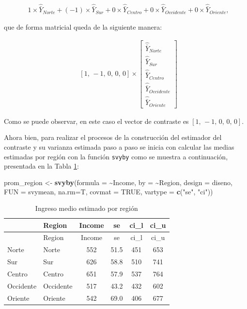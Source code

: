 \documentclass[
  spanish,
  12pt,
]{book}
\newenvironment{Shaded}{\begin{snugshade}}{\end{snugshade}}
\newcommand{\AttributeTok}[1]{\textcolor[rgb]{0.13,0.29,0.53}{#1}}
\newcommand{\ConstantTok}[1]{\textcolor[rgb]{0.56,0.35,0.01}{#1}}
\newcommand{\FunctionTok}[1]{\textcolor[rgb]{0.13,0.29,0.53}{\textbf{#1}}}
\newcommand{\NormalTok}[1]{#1}
\newcommand{\OtherTok}[1]{\textcolor[rgb]{0.56,0.35,0.01}{#1}}
\newcommand{\SpecialCharTok}[1]{\textcolor[rgb]{0.81,0.36,0.00}{\textbf{#1}}}
\newcommand{\StringTok}[1]{\textcolor[rgb]{0.31,0.60,0.02}{#1}}
\begin{document}
\begin{eqnarray*}
 & 1\times\hat{\bar{Y}}_{Norte}+\left(-1\right)\times\hat{\bar{Y}}_{Sur}+0\times\hat{\bar{Y}}_{Centro}+0\times\hat{\bar{Y}}_{Occidente}+0\times\hat{\bar{Y}}_{Oriente},
\end{eqnarray*}

que de forma matricial queda de la siguiente manera:

\begin{eqnarray*}
 & \left[1,\,-1,\,0,\,0,\,0\right]\times\left[\begin{array}{c}
\hat{\bar{Y}}_{Norte}\\
\hat{\bar{Y}}_{Sur}\\
\hat{\bar{Y}}_{Centro}\\
\hat{\bar{Y}}_{Occidente}\\
\hat{\bar{Y}}_{Oriente}
\end{array}\right]
\end{eqnarray*}

Como se puede observar, en este caso el vector de contraste es \(\left[1,\,-1,\,0,\,0,\,0\right]\).

Ahora bien, para realizar el procesos de la construcción del estimador del contraste y su varianza estimada paso a paso se inicia con calcular las medias estimadas por región con la función \texttt{svyby} como se muestra a continuación, presentada en la Tabla \ref{tab:tab-prom-region}:

\begin{Shaded}
\begin{Highlighting}[]
\NormalTok{prom\_region }\OtherTok{\textless{}{-}} \FunctionTok{svyby}\NormalTok{(}\AttributeTok{formula =} \SpecialCharTok{\textasciitilde{}}\NormalTok{Income,}
                     \AttributeTok{by =} \SpecialCharTok{\textasciitilde{}}\NormalTok{Region,}
                     \AttributeTok{design =}\NormalTok{ diseno,}
                     \AttributeTok{FUN =}\NormalTok{ svymean,}
                     \AttributeTok{na.rm=}\NormalTok{T,}
                     \AttributeTok{covmat =} \ConstantTok{TRUE}\NormalTok{,}
                     \AttributeTok{vartype =} \FunctionTok{c}\NormalTok{(}\StringTok{"se"}\NormalTok{, }\StringTok{"ci"}\NormalTok{))}
\end{Highlighting}
\end{Shaded}

\begin{longtable}[]{@{}llcccc@{}}
\caption{\label{tab:tab-prom-region}Ingreso medio estimado por región}\tabularnewline
\toprule\noalign{}
& Region & Income & se & ci\_l & ci\_u \\
\midrule\noalign{}
\endfirsthead
\toprule\noalign{}
& Region & Income & se & ci\_l & ci\_u \\
\midrule\noalign{}
\endhead
\bottomrule\noalign{}
\endlastfoot
Norte & Norte & 552 & 51.5 & 451 & 653 \\
Sur & Sur & 626 & 58.8 & 510 & 741 \\
Centro & Centro & 651 & 57.9 & 537 & 764 \\
Occidente & Occidente & 517 & 43.2 & 432 & 602 \\
Oriente & Oriente & 542 & 69.0 & 406 & 677 \\
\end{longtable}
\end{document}
